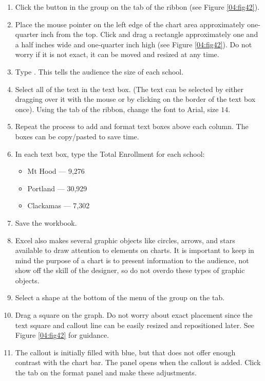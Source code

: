 \begin{enumerate}
	\item Click the  button in the  group on the  tab of the ribbon (see Figure \ref{04:fig42}). 
	\item Place the mouse pointer on the left edge of the chart area approximately one-quarter inch from the top. Click and drag a rectangle approximately one and a half inches wide and one-quarter inch high (see Figure \ref{04:fig42}). Do not worry if it is not exact, it can be moved and resized at any time.
	\item Type . This tells the audience the size of each school.
	\item Select all of the text in the text box. (The text can be selected by either dragging over it with the mouse or by clicking on the border of the text box once). Using the  tab of the ribbon, change the font to Arial, size $ 14 $.
	\item Repeat the process to add and format text boxes above each column. The boxes can be copy/pasted to save time.
	\item In each text box, type the Total Enrollment for each school:

	\begin{itemize}
		\item Mt Hood --- 9,276
		\item Portland --- 30,929
		\item Clackamas --- 7,302
	\end{itemize}

	\item Save the workbook.

	\item Excel also makes several graphic objects like circles, arrows, and stars available to draw attention to elements on charts. It is important to keep in mind the purpose of a chart is to present information to the audience, not show off the skill of the designer, so do not overdo these types of graphic objects.
	\item Select a  shape at the bottom of the  menu of the  group on the  tab.
	\item Drag a square on the graph. Do not worry about exact placement since the text square and callout line can be easily resized and repositioned later. See Figure \ref{04:fig42} for guidance.
	\item The callout is initially filled with blue, but that does not offer enough contrast with the chart bar. The  panel opens when the callout is added. Click the  tab on the format panel and make these adjustments.
	

\end{enumerate}
